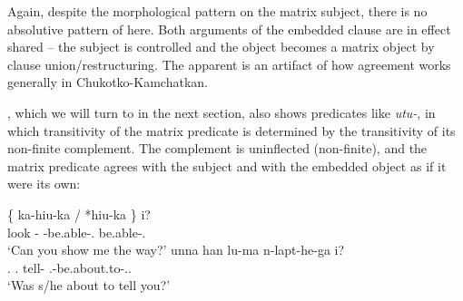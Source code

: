 \documentclass[output=paper]{langsci/langscibook}
\begin{document}
\ea \label{treein}
\z

Again, despite the morphological pattern on the matrix subject, there is no
absolutive pattern of  here. Both arguments of the embedded clause are
in effect shared -- the subject is controlled and the object becomes a matrix
object by clause union/restructuring. The apparent  is an
artifact of how agreement works generally in Chukotko-Kamchatkan.

, which we will turn to in the next section, also shows predicates like
 \emph{utu-}, in which transitivity of the matrix predicate is
determined by the transitivity of its non-finite complement. The complement is
uninflected (non-finite), and the matrix predicate agrees with the subject and
with the embedded object as if it were its own:

\ea \label{belhi} \begin{xlista}
    \ex {} \{ ka-hiu-ka / *hiu-ka \}   i?\\
    {} look \Caus-\Sbjv{} {} {} \Fsg{}-be.able-\Second.\Su{} {} \hphantom{*}be.able-\Second.\Su{} {} \glossQ{} \\
	\glt `Can you show me the way?'
	\ex \gll  unna han lu-ma n-lapt-he-ga i?\\
	\Tsg.\Erg{} \Ssg.\Abs{} tell-\Inf{} \Third.\Aa{}-be.about.to-\Pst.\Second.\Su{} \glossQ{} \\
	\glt `Was s/he about to tell you?'
	\end{xlista}
\z
\end{document}
